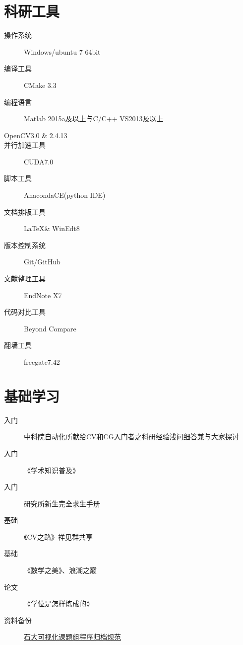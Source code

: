 \documentclass[a4paper，12pt]{article}
\begin{document}
\section{科研工具}

\begin{description}

\item[操作系统] Windows/ubuntu 7 64bit

\item[编译工具] CMake 3.3

\item[编程语言] Matlab 2015a及以上与C/C++ VS2013及以上

\item[OpenCV3.0 \& 2.4.13]

\item[并行加速工具] CUDA7.0

\item[脚本工具] AnacondaCE(python IDE)

\item[文档排版工具] \LaTeX \& WinEdt8

\item[版本控制系统] Git/GitHub

\item[文献整理工具] EndNote X7

\item[代码对比工具] Beyond Compare

\item[翻墙工具] freegate7.42

\end{description}

\section{基础学习}

\begin{description}

\item[入门]中科院自动化所献给CV和CG入门者之科研经验浅问细答兼与大家探讨

\item[入门]《学术知识普及》

\item[入门] 研究所新生完全求生手册

\item[基础]《CV之路》祥见群共享

\item[基础]《数学之美》、浪潮之巅

\item[论文]《学位是怎样炼成的》

\item[资料备份] \href{https://github.com/imistyrain/UPCRules}{石大可视化课题组程序归档规范}

\end{description}
\end{document}
